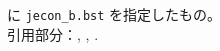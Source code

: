 \documentclass[10pt]{jarticle}
\begin{document}
\verb|| に \verb|jecon_b.bst| を指定したもの。
\vspace{1em}\\
引用部分：\citet{brezis93:_leapf_inter_compet},
\citet{ito85:_inte_trad}, \citet{brezis93:_leapf_inter_compet}.

\nocite{*}




\end{document}
